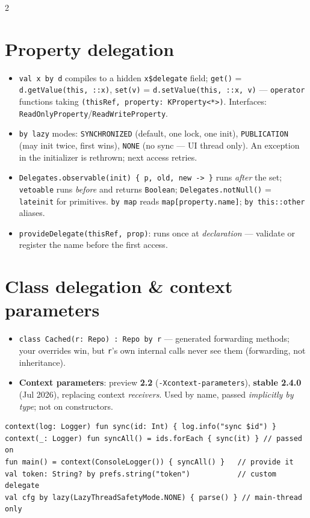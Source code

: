 \documentclass[8pt]{extarticle}
\newcommand\ar{\texttt{\hbox{-}\hbox{>}}}
\newcommand\cc{\texttt{\hbox{:}\hbox{:}}}
\begin{document}
\begin{multicols}{2}
\section{Property delegation}
\begin{itemize}\raggedright
  \item \texttt{val x by d} compiles to a hidden \texttt{x\$delegate} field;
        \texttt{get()} = \texttt{d.getValue(this, }\cc\texttt{x)}, \texttt{set(v)} =
        \texttt{d.setValue(this, }\cc\texttt{x, v)} — \texttt{operator} functions taking
        \texttt{(thisRef, property: KProperty<\hbox{*}>)}. Interfaces:
        \texttt{ReadOnlyProperty}/\texttt{ReadWriteProperty}.
  \item \texttt{by lazy} modes: \texttt{SYNCHRONIZED} (default, one lock, one init),
        \texttt{PUBLICATION} (may init twice, first wins), \texttt{NONE} (no sync — UI
        thread only). An exception in the initializer is rethrown; next access retries.
  \item \texttt{Delegates.observable(init) \{ p, old, new \ar\ \}} runs \emph{after} the set;
        \texttt{vetoable} runs \emph{before} and returns \texttt{Boolean};
        \texttt{Delegates.notNull()} = \texttt{lateinit} for primitives.
        \texttt{by map} reads \texttt{map[property.name]}; \texttt{by this}\cc\texttt{other} aliases.
  \item \texttt{provideDelegate(thisRef, prop)}: runs once at \emph{declaration} — validate or
        register the name before the first access.
\end{itemize}

\section{Class delegation \& context parameters}
\begin{itemize}\raggedright
  \item \texttt{class Cached(r: Repo) : Repo by r} — generated forwarding methods; your
        overrides win, but \texttt{r}'s own internal calls never see them (forwarding, not
        inheritance).
  \item \textbf{Context parameters}: preview \textbf{2.2} (\texttt{-Xcontext-parameters}),
        \textbf{stable 2.4.0} (Jul 2026), replacing context \emph{receivers}. Used by name,
        passed \emph{implicitly by type}; not on constructors.
\end{itemize}
\begin{lstlisting}[language=KotlinSheet]
context(log: Logger) fun sync(id: Int) { log.info("sync $id") }
context(_: Logger) fun syncAll() = ids.forEach { sync(it) } // passed on
fun main() = context(ConsoleLogger()) { syncAll() }   // provide it
val token: String? by prefs.string("token")           // custom delegate
val cfg by lazy(LazyThreadSafetyMode.NONE) { parse() } // main-thread only
\end{lstlisting}


\end{multicols}
\end{document}
